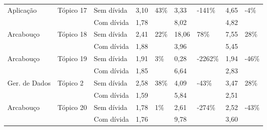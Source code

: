\begin{longtable}{|l|l|l|l|l|l|l|l|l|}
\multirow{2}{*}{Aplicação}     & \multirow{2}{*}{Tópico 17} & Sem dívida              & 3,10            & \multirow{2}{*}{43\%}   & 3,33            & \multirow{2}{*}{-141\%}  & 4,65            & \multirow{2}{*}{-4\%}   \\ \cline{3-4} \cline{6-6} \cline{8-8}
                               &                            & Com dívida           & 1,78            &                         & 8,02            &                          & 4,82            &                         \\ \hline
\multirow{2}{*}{Arcabouço}     & \multirow{2}{*}{Tópico 18} & Sem dívida              & 2,41            & \multirow{2}{*}{22\%}   & 18,06           & \multirow{2}{*}{78\%}    & 7,55            & \multirow{2}{*}{28\%}   \\ \cline{3-4} \cline{6-6} \cline{8-8}
                               &                            & Com dívida           & 1,88            &                         & 3,96            &                          & 5,45            &                         \\ \hline
\multirow{2}{*}{Arcabouço}     & \multirow{2}{*}{Tópico 19} & Sem dívida              & 1,91            & \multirow{2}{*}{3\%}    & 0,28            & \multirow{2}{*}{-2262\%} & 1,94            & \multirow{2}{*}{-46\%}  \\ \cline{3-4} \cline{6-6} \cline{8-8}
                               &                            & Com dívida           & 1,85            &                         & 6,64            &                          & 2,83            &                         \\ \hline
\multirow{2}{*}{Ger. de Dados} & \multirow{2}{*}{Tópico 2}  & Sem dívida              & 2,58            & \multirow{2}{*}{38\%}   & 4,09            & \multirow{2}{*}{-43\%}   & 3,47            & \multirow{2}{*}{28\%}   \\ \cline{3-4} \cline{6-6} \cline{8-8}
                               &                            & Com dívida           & 1,59            &                         & 5,84            &                          & 2,51            &                         \\ \hline
\multirow{2}{*}{Arcabouço}     & \multirow{2}{*}{Tópico 20} & Sem dívida              & 1,78            & \multirow{2}{*}{1\%}    & 2,61            & \multirow{2}{*}{-274\%}  & 2,52            & \multirow{2}{*}{-43\%}  \\ \cline{3-4} \cline{6-6} \cline{8-8}
                               &                            & Com dívida           & 1,76            &                         & 9,78            &                          & 3,60            &                         \\ \hline

\end{longtable}
